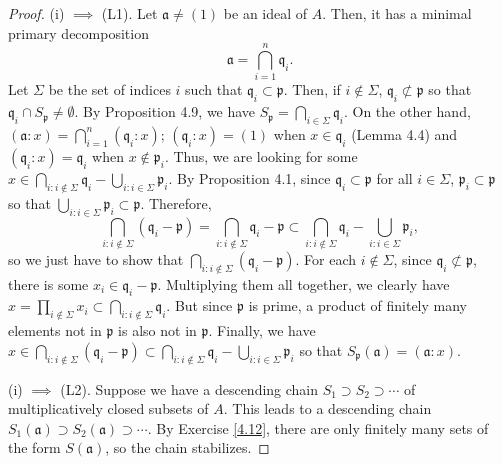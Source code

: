\begin{proof}
(i) $\implies$ (L1). Let $\mathfrak{a} \neq (1)$ be an ideal of $A$. Then, it has a minimal primary decomposition
$$\mathfrak{a} = \bigcap_{i=1}^n \mathfrak{q}_i.$$
Let $\Sigma$ be the set of indices $i$ such that $\mathfrak{q}_i \subset \mathfrak{p}$. Then, if $i \not\in \Sigma$, $\mathfrak{q}_i \not\subset \mathfrak{p}$
so that $\mathfrak{q}_i \cap S_{\mathfrak{p}} \neq \emptyset$. By Proposition 4.9, we have $S_{\mathfrak{p}} = \bigcap_{i \in \Sigma}\mathfrak{q}_i$.
On the other hand, $(\mathfrak{a}:x) = \bigcap_{i=1}^n (\mathfrak{q}_i:x)$; $(\mathfrak{q}_i : x) = (1)$ when $x \in \mathfrak{q}_i$ (Lemma 4.4) and $(\mathfrak{q}_i : x) = \mathfrak{q}_i$
when $x \not\in \mathfrak{p}_i$. Thus, we are looking for some $x \in \bigcap_{i:i\not\in \Sigma} \mathfrak{q}_i - \bigcup_{i:i\in \Sigma}\mathfrak{p}_i$. By Proposition 4.1,
since $\mathfrak{q}_i \subset \mathfrak{p}$ for all $i \in \Sigma$, $\mathfrak{p}_i \subset \mathfrak{p}$ so that $\bigcup_{i:i\in \Sigma}\mathfrak{p}_i \subset \mathfrak{p}$. Therefore,
$$\bigcap_{i:i\not\in \Sigma} (\mathfrak{q}_i - \mathfrak{p}) = \bigcap_{i:i\not\in \Sigma} \mathfrak{q}_i - \mathfrak{p} \subset \bigcap_{i:i\not\in \Sigma} \mathfrak{q}_i - \bigcup_{i:i\in \Sigma}\mathfrak{p}_i,$$
so we just have to show that $\bigcap_{i:i\not\in \Sigma} (\mathfrak{q}_i - \mathfrak{p})$. For each $i \not\in \Sigma$, since $\mathfrak{q}_i \not\subset \mathfrak{p}$, there is some $x_i \in \mathfrak{q}_i - \mathfrak{p}$.
Multiplying them all together, we clearly have $x = \prod_{i \not\in \Sigma} x_i \subset \bigcap_{i:i\not\in \Sigma} \mathfrak{q}_i$. But since $\mathfrak{p}$ is prime, a product of finitely many elements not in $\mathfrak{p}$
is also not in $\mathfrak{p}$. Finally, we have $x \in \bigcap_{i:i\not\in \Sigma} (\mathfrak{q}_i - \mathfrak{p}) \subset \bigcap_{i:i\not\in \Sigma} \mathfrak{q}_i - \bigcup_{i:i\in \Sigma}\mathfrak{p}_i$ so that 
$S_{\mathfrak{p}}(\mathfrak{a}) = (\mathfrak{a}:x)$.

(i) $\implies$ (L2). Suppose we have a descending chain $S_1 \supset S_2 \supset \cdots$ of multiplicatively closed subsets of $A$. This leads to a descending chain $S_1(\mathfrak{a}) \supset S_2(\mathfrak{a}) \supset \cdots$.
By Exercise \ref{4.12}, there are only finitely many sets of the form $S(\mathfrak{a})$, so the chain stabilizes.


\end{proof}
